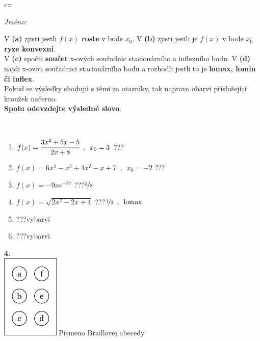 \documentclass[10pt]{report}
\begin{document}
\begin{tabular}{c:c}
\begin{minipage}[c][104.5mm][t]{0.5\linewidth}
\begin{center}
\textit{Jméno:}\phantom{xxxxxxxxxxxxxxxxxxxxxxxxxxxxxxxxxxxxxxxxxxxxxxxxxxxxxxxxxxxxxxxxx}\\[5mm]
\begin{minipage}{0.95\linewidth}
\begin{center}
{\small V \textbf{(a)} zjisti jestli $f(x)$ \textbf{roste} v bode $x_0$. V \textbf{(b)} zjisti jestli je $f(x)$ v bode $x_0$ \textbf{ryze konvexní}.\\V \textbf{(c)} spočti \textbf{součet} x-ových souřadnic stacionárního a inflexního bodu. V \textbf{(d)} najdi x-ovou souřadnici stacionárního bodu a rozhodli jestli to je \textbf{lomax, lomin či inflex}.\\Pokud se výsledky shodujú s těmi za otazníky, tak napravo obarvi příslušející kroužek načerno.\\\textbf{Spolu odevzdejte výsledné slovo}}.
\end{center}
\end{minipage}
\\[1mm]
\begin{minipage}{0.79\linewidth}
\begin{center}
\begin{varwidth}{\linewidth}
\begin{enumerate}
\normalsize
\item $f(x)=\cfrac{3x^2+5x-5}{2x+8}\enspace , \enspace x_0=3$\quad \dotfill\; ???\;\dotfill \quad {}
\item $f(x)=6x^4-x^3+4x^2-x+7\enspace , \enspace x_0=-2$\quad \dotfill\; ???\;\dotfill \quad {}
\item $f(x)=-9xe^{-8x}$\quad \dotfill\; ???\;\dotfill \quad $\nicefrac{3}{8}$
\item $f(x)=\sqrt{2x^2-2x+4}$\quad \dotfill\; ???\;\dotfill \quad $\nicefrac{1}{2}\enspace , \enspace\mathrm{lomax}$
\item \quad \dotfill\; ???\;\dotfill \quad vybarvi
\item \quad \dotfill\; ???\;\dotfill \quad vybarvi
\end{enumerate}
\end{varwidth}
\end{center}
\end{minipage}
\begin{minipage}{0.20\linewidth}
\begin{center}
{\Huge\bfseries 4.} \\[2mm]
\includegraphics[height=40mm]{../images/braille.png}
{\small Písmeno Braillovej abecedy}
\end{center}
\end{minipage}
\end{center}
\end{minipage}
%
\end{tabular}
\end{document}
